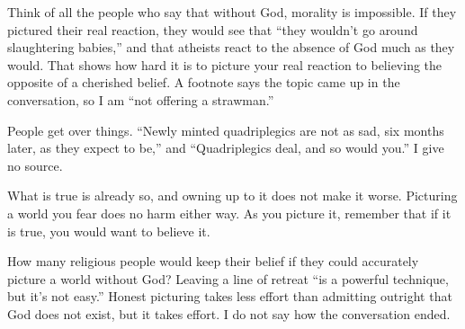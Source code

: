 Think of all the people who say that without God, morality is impossible. If they pictured their real reaction, they would see that ``they wouldn't go around slaughtering babies,'' and that atheists react to the absence of God much as they would. That shows how hard it is to picture your real reaction to believing the opposite of a cherished belief. A footnote says the topic came up in the conversation, so I am ``not offering a strawman.'' 

People get over things. ``Newly minted quadriplegics are not as sad, six months later, as they expect to be,'' and ``Quadriplegics deal, and so would you.'' I give no source. 

What is true is already so, and owning up to it does not make it worse. Picturing a world you fear does no harm either way. As you picture it, remember that if it is true, you would want to believe it. 

How many religious people would keep their belief if they could accurately picture a world without God? Leaving a line of retreat ``is a powerful technique, but it's not easy.'' Honest picturing takes less effort than admitting outright that God does not exist, but it takes effort. I do not say how the conversation ended.
